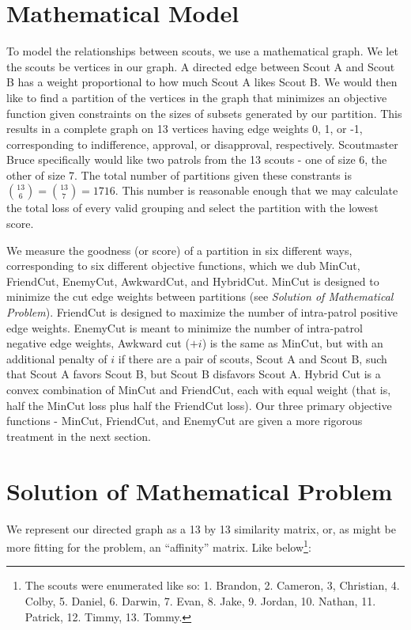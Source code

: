 \documentclass{amsart}
\theoremstyle{definition}
\theoremstyle{remark}
\numberwithin{equation}{section}
\begin{document}
\section*{Mathematical Model}
To model the relationships between scouts, we use a mathematical graph. We let the scouts be vertices in our graph. A directed edge between Scout A and Scout B has a weight proportional to how much Scout A likes Scout B. We would then like to find a partition of the vertices in the graph that minimizes an objective function given constraints on the sizes of subsets generated by our partition. This results in a complete graph on 13 vertices having edge weights 0, 1, or -1, corresponding to indifference, approval, or disapproval, respectively. Scoutmaster Bruce specifically would like two patrols from the 13 scouts - one of size 6, the other of size 7. The total number of partitions given these constrants is $\binom{13}{6} = \binom{13}{7} = 1716$. This number is reasonable enough that we may calculate the total loss of every valid grouping and select the partition with the lowest score.

We measure the goodness (or score) of a partition in six different ways, corresponding to six different objective functions, which we dub MinCut, FriendCut, EnemyCut, AwkwardCut, and HybridCut. MinCut is designed to minimize the cut edge weights between partitions (see \textit{Solution of Mathematical Problem}). FriendCut is designed to maximize the number of intra-patrol positive edge weights. EnemyCut is meant to minimize the number of intra-patrol negative edge weights, Awkward cut ($+i$) is the same as MinCut, but with an additional penalty of $i$ if there are a pair of scouts, Scout A and Scout B, such that Scout A favors Scout B, but Scout B disfavors Scout A. Hybrid Cut is a convex combination of MinCut and FriendCut, each with equal weight (that is, half the MinCut loss plus half the FriendCut loss). Our three primary objective functions - MinCut, FriendCut, and EnemyCut are given a more rigorous treatment in the next section.

\section*{Solution of Mathematical Problem}
We represent our directed graph as a 13 by 13 similarity matrix, or, as might
be more fitting for the problem, an ``affinity'' matrix. Like below\footnote{The scouts were enumerated like so: 1. Brandon, 2. Cameron, 3, Christian, 4. Colby, 5. Daniel, 6. Darwin, 7. Evan, 8. Jake, 9. Jordan, 10. Nathan, 11. Patrick, 12. Timmy, 13. Tommy.}:
\end{document}
